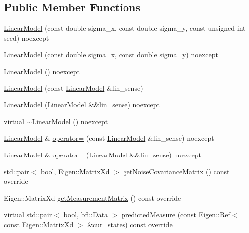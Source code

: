 \subsection*{Public Member Functions}
\begin{DoxyCompactItemize}
\item 
\mbox{\hyperlink{classbfl_1_1LinearModel_ab10327a762b75b43d765d1b41c99dc51}{Linear\+Model}} (const double sigma\+\_\+x, const double sigma\+\_\+y, const unsigned int seed) noexcept
\item 
\mbox{\hyperlink{classbfl_1_1LinearModel_a397d260d3e6a0f76e431b2986144e74f}{Linear\+Model}} (const double sigma\+\_\+x, const double sigma\+\_\+y) noexcept
\item 
\mbox{\hyperlink{classbfl_1_1LinearModel_a85ae7689e2b591848faeaee5ebc1ddeb}{Linear\+Model}} () noexcept
\item 
\mbox{\hyperlink{classbfl_1_1LinearModel_a9c495132cca5e42e73517aaf7718539d}{Linear\+Model}} (const \mbox{\hyperlink{classbfl_1_1LinearModel}{Linear\+Model}} \&lin\+\_\+sense)
\item 
\mbox{\hyperlink{classbfl_1_1LinearModel_a46f1d718d2b8234d714b128a7ce7ce85}{Linear\+Model}} (\mbox{\hyperlink{classbfl_1_1LinearModel}{Linear\+Model}} \&\&lin\+\_\+sense) noexcept
\item 
virtual \mbox{\hyperlink{classbfl_1_1LinearModel_a5dc0180e77824d11eebda14c84f046ea}{$\sim$\+Linear\+Model}} () noexcept
\item 
\mbox{\hyperlink{classbfl_1_1LinearModel}{Linear\+Model}} \& \mbox{\hyperlink{classbfl_1_1LinearModel_a71ceb19612369c796840cbb592e99365}{operator=}} (const \mbox{\hyperlink{classbfl_1_1LinearModel}{Linear\+Model}} \&lin\+\_\+sense) noexcept
\item 
\mbox{\hyperlink{classbfl_1_1LinearModel}{Linear\+Model}} \& \mbox{\hyperlink{classbfl_1_1LinearModel_ab918eedc96632e51939fc9aad126215c}{operator=}} (\mbox{\hyperlink{classbfl_1_1LinearModel}{Linear\+Model}} \&\&lin\+\_\+sense) noexcept
\item 
std\+::pair$<$ bool, Eigen\+::\+Matrix\+Xd $>$ \mbox{\hyperlink{classbfl_1_1LinearModel_a9adc7aabd58e79ce71c283866ddbf655}{get\+Noise\+Covariance\+Matrix}} () const override
\item 
Eigen\+::\+Matrix\+Xd \mbox{\hyperlink{classbfl_1_1LinearModel_a7dbfa7e8cbdc9ee863febf92e6046400}{get\+Measurement\+Matrix}} () const override
\item 
virtual std\+::pair$<$ bool, \mbox{\hyperlink{namespacebfl_af6b103c6821db1b54452f776fdd9dd02}{bfl\+::\+Data}} $>$ \mbox{\hyperlink{classbfl_1_1LinearMeasurementModel_a8831b8acb4790db4c69db73200375c69}{predicted\+Measure}} (const Eigen\+::\+Ref$<$ const Eigen\+::\+Matrix\+Xd $>$ \&cur\+\_\+states) const override

\end{DoxyCompactItemize}
